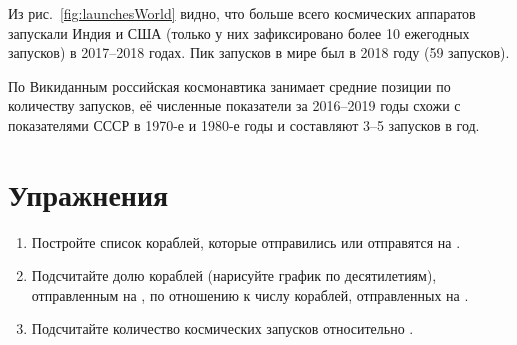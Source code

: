 Из рис.~\ref{fig:launchesWorld} видно, что больше всего космических аппаратов 
запускали Индия и США 
(только у них зафиксировано более 10 ежегодных запусков) в 2017--2018 годах. 
Пик запусков в мире был в 2018 году (59 запусков). 

По Викиданным российская космонавтика занимает средние позиции по количеству запусков, 
её численные показатели за 2016--2019 годы схожи с показателями СССР в 1970-е и 1980-е годы 
и составляют 3--5 запусков в год.

\section{Упражнения}
\begin{enumerate}
  \item Постройте список кораблей, которые отправились или отправятся на .
  \item Подсчитайте долю кораблей (нарисуйте график по десятилетиям), 
        отправленным на , 
        по отношению к числу кораблей, отправленных на .
  \item Подсчитайте количество  космических запусков 
      относительно .%
%
\end{enumerate}
